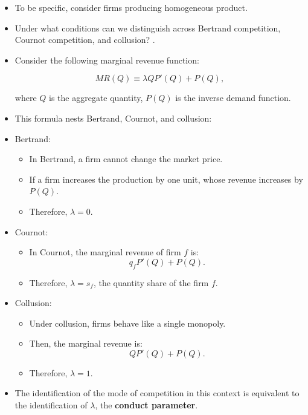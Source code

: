 \documentclass[]{book}
\providecommand{\tightlist}{%
  \setlength{\itemsep}{0pt}\setlength{\parskip}{0pt}}
\begin{document}
\begin{itemize}
\tightlist
\item
  To be specific, consider firms producing homogeneous product.
\item
  Under what conditions can we distinguish across Bertrand competition,
  Cournot competition, and collusion? \citep{Bresnahan1982a}.
\item
  Consider the following marginal revenue function:

  \begin{equation}
  MR(Q) \equiv \lambda Q P'(Q) + P(Q),
  \end{equation}

  where \(Q\) is the aggregate quantity, \(P(Q)\) is the inverse demand
  function.
\item
  This formula nests Bertrand, Cournot, and collusion:
\item
  Bertrand:

  \begin{itemize}
  \tightlist
  \item
    In Bertrand, a firm cannot change the market price.
  \item
    If a firm increases the production by one unit, whose revenue
    increases by \(P(Q)\).
  \item
    Therefore, \(\lambda = 0\).
  \end{itemize}
\item
  Cournot:

  \begin{itemize}
  \tightlist
  \item
    In Cournot, the marginal revenue of firm \(f\) is: \[
    q_f P'(Q) + P(Q).
    \]
  \item
    Therefore, \(\lambda = s_f\), the quantity share of the firm \(f\).
  \end{itemize}
\item
  Collusion:

  \begin{itemize}
  \tightlist
  \item
    Under collusion, firms behave like a single monopoly.
  \item
    Then, the marginal revenue is: \[
    QP'(Q) + P(Q).
    \]
  \item
    Therefore, \(\lambda = 1\).
  \end{itemize}
\item
  The identification of the mode of competition in this context is
  equivalent to the identification of \(\lambda\), the \textbf{conduct
  parameter}.
\end{itemize}
\end{document}
